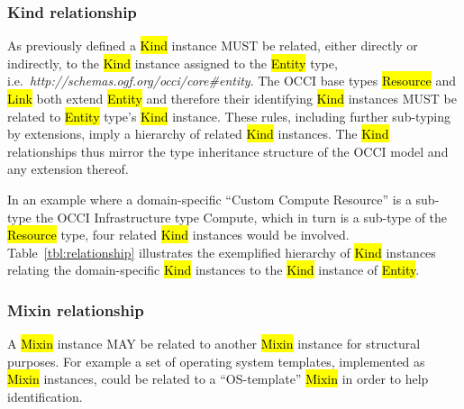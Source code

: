 \documentclass[10pt,a4paper,british]{article}
\begin{document}
\subsubsection{Kind relationship}
\label{sec:kind_relationship}
As previously defined a \hl{Kind} instance MUST be related, either directly or
indirectly, to the \hl{Kind} instance assigned to the \hl{Entity} type,
i.e.~\textit{http://schemas.ogf.org/occi/core\#entity}.
%
The OCCI base types \hl{Resource} and \hl{Link} both extend \hl{Entity} and
therefore their identifying \hl{Kind} instances MUST be related to \hl{Entity}
type's \hl{Kind} instance.
%
These rules, including further sub-typing by extensions, imply a hierarchy of
related \hl{Kind} instances. The \hl{Kind} relationships thus mirror the type
inheritance structure of the OCCI model and any extension thereof.

In an example where a domain-specific ``Custom Compute Resource'' is a sub-type
the OCCI Infrastructure type Compute, which in turn is a sub-type of the
\hl{Resource} type, four related \hl{Kind} instances would be involved.
%
Table~\ref{tbl:relationship} illustrates the exemplified hierarchy of \hl{Kind}
instances relating the domain-specific \hl{Kind} instances to the \hl{Kind}
instance of \hl{Entity}.


\subsubsection{Mixin relationship}
\label{sec:mixin_relationship}
A \hl{Mixin} instance MAY be related to another \hl{Mixin} instance for
structural purposes. For example a set of operating system templates,
implemented as \hl{Mixin} instances, could be related to a ``OS-template''
\hl{Mixin} in order to help identification.
\end{document}

